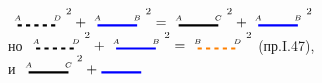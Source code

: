 \documentclass[12pt,a4paper]{report}
\begin{document}
\begin{minipage}[t]{0.57\textwidth}
\begin{center}
\begin{math}
  \begin{tikzpicture}
      \draw[dashed, black,ultra thick] (0,0) -- (1,0);
    \node[above] at (0,0) {{\tiny$A$}};
    \node[above] at (1,0) {{\tiny$D$}};
  \end{tikzpicture} ^{\text{2}} + 
  \begin{tikzpicture}
        \draw[blue,ultra thick] (0,0) -- (1,0);
        \node[above] at (0,0) {{\tiny$A$}};
        \node[above] at (1,0) {{\tiny$B$}};
    \end{tikzpicture} ^{\text{2}} =
    \begin{tikzpicture}
    \draw[black,ultra thick] (0,0) -- (1,0);
    \node[above] at (0,0) {{\tiny$A$}};
    \node[above] at (1,0) {{\tiny$C$}};
  \end{tikzpicture} ^{\text{2}} +
  \begin{tikzpicture}
        \draw[blue,ultra thick] (0,0) -- (1,0);
        \node[above] at (0,0) {{\tiny$A$}};
        \node[above] at (1,0) {{\tiny$B$}};
    \end{tikzpicture} ^{\text{2}}
  \end{math} \\
  но
   \begin{math}
    \begin{tikzpicture}
      \draw[dashed, black,ultra thick] (0,0) -- (1,0);
    \node[above] at (0,0) {{\tiny$A$}};
    \node[above] at (1,0) {{\tiny$D$}};
  \end{tikzpicture} ^{\text{2}} + 
  \begin{tikzpicture}
        \draw[blue,ultra thick] (0,0) -- (1,0);
        \node[above] at (0,0) {{\tiny$A$}};
        \node[above] at (1,0) {{\tiny$B$}};
    \end{tikzpicture} ^{\text{2}} = 
    \begin{tikzpicture}
      \draw[dashed, orange, ultra thick] (0,0) -- (1,0);
    \node[above] at (0,0) {{\tiny$B$}};
    \node[above] at (1,0) {{\tiny$D$}};
  \end{tikzpicture} ^{\text{2}}
  \end{math} (пр.I.{\tiny47}), \\
  и
  \begin{math}
      \begin{tikzpicture}
    \draw[black,ultra thick] (0,0) -- (1,0);
    \node[above] at (0,0) {{\tiny$A$}};
    \node[above] at (1,0) {{\tiny$C$}};
  \end{tikzpicture} ^{\text{2}} +
  \begin{tikzpicture}
        \draw[blue,ultra thick] (0,0) -- (1,0);

\end{tikzpicture}
\end{math}
\end{center}
\end{minipage}
\end{document}
